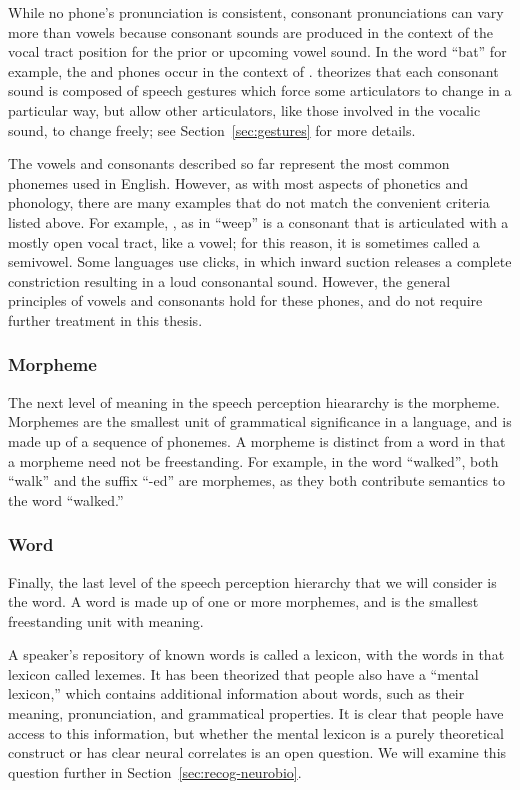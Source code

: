 While no phone's pronunciation is consistent,
consonant pronunciations can vary more than vowels
because consonant sounds are produced in the context
of the vocal tract position for
the prior or upcoming vowel sound.
In the word ``bat'' for example,
the \ipa{[b]} and \ipa{[t]} phones
occur in the context of \ipa{[\ae]}.
\citet{kroger1993} theorizes that
each consonant sound is composed
of speech gestures which force some
articulators to change in a particular way,
but allow other articulators,
like those involved in the vocalic sound,
to change freely;
see Section~\ref{sec:gestures}
for more details.

The vowels and consonants described so far
represent the most common phonemes used
in English.
However, as with most aspects
of phonetics and phonology,
there are many examples that do not
match the convenient criteria listed above.
For example, \ipa{[w]}, as in ``weep''
is a consonant that is articulated
with a mostly open vocal tract,
like a vowel;
for this reason, it is sometimes called a semivowel.
Some languages use clicks,
in which inward suction releases a complete constriction
resulting in a loud consonantal sound.
However, the general principles
of vowels and consonants hold
for these phones,
and do not require further treatment
in this thesis.

\subsubsection{Morpheme}

The next level of meaning in the
speech perception hieararchy
is the morpheme.
Morphemes are the smallest unit
of grammatical significance
in a language,
and is made up of a sequence
of phonemes.
A morpheme is distinct
from a word in that
a morpheme need not be freestanding.
For example, in the word
``walked'', both ``walk''
and the suffix ``-ed''
are morphemes,
as they both contribute
semantics to the word ``walked.''

\subsubsection{Word}

Finally, the last level
of the speech perception hierarchy
that we will consider is the word.
A word is made up of
one or more morphemes,
and is the smallest freestanding unit
with meaning.

A speaker's repository of known words
is called a lexicon,
with the words in that lexicon
called lexemes.
It has been theorized that
people also have a ``mental lexicon,''
which contains additional information
about words,
such as their meaning, pronunciation,
and grammatical properties.
It is clear that people have access
to this information,
but whether the mental lexicon
is a purely theoretical construct
or has clear neural correlates
is an open question.
We will examine this question
further in Section~\ref{sec:recog-neurobio}.

